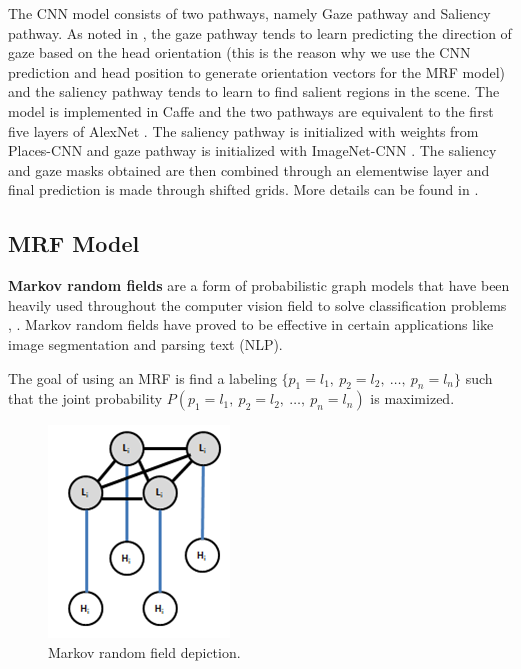 \documentclass[10pt,twocolumn,letterpaper]{article}
\begin{document}
The CNN model consists of two pathways, namely Gaze pathway and Saliency pathway. As noted in \cite{nips15_recasens}, the gaze pathway tends to learn predicting the direction of gaze based on the head orientation (this is the reason why we use the CNN prediction and head position to generate orientation vectors for the MRF model) and the saliency pathway tends to learn to find salient regions in the scene. The model is implemented in Caffe \cite{jia2014caffe} and the two pathways are equivalent to the first five layers of AlexNet \cite{krizhevsky2012imagenet}. The saliency pathway is initialized with weights from Places-CNN \cite{zhou2014learning} and gaze pathway is initialized with ImageNet-CNN \cite{russakovsky2015imagenet}.
The saliency and gaze masks obtained are then combined through an elementwise layer and final prediction is made through shifted grids. More details can be found in \cite{nips15_recasens}.

\subsection{MRF Model}

\textbf{Markov random fields} are a form of probabilistic graph models that have been heavily used throughout the computer vision field to solve classification problems \cite{wang2013markov}, \cite{quattoni2007hidden}. Markov random fields have proved to be effective in certain applications like image segmentation and parsing text (NLP).

The goal of using an MRF is find a labeling $\{p_1 = l_1,\ p_2 = l_2,\ \dots,\ p_n = l_n\}$ such that the joint probability $P(p_1 = l_1,\ p_2 = l_2,\ \dots,\ p_n = l_n)$ is maximized.

\begin{figure}[H]
  \begin{center}
    \includegraphics[width=0.3\linewidth]{images/mrf_model.png}
  \end{center}
  \vspace{-0.3cm}
   \caption{Markov random field depiction.}
  \vspace{-0.5cm}
\end{figure}
\end{document}
